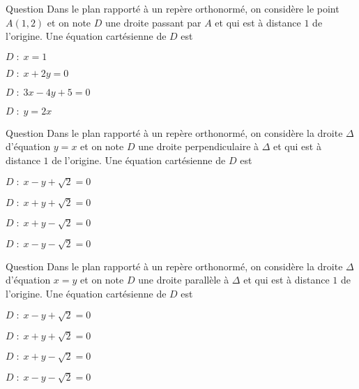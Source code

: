 \begin{multi}[multiple,feedback=
{Une équation cartésienne d'une droite \(D\) passant par \(A\) est de la forme \(a(x-1)+b(y-2)=0\). Mais,
\[1=\mbox{d}(O,D)=\frac{|a+2b|}{\sqrt{a^2+b^2}}\Leftrightarrow b=0\mbox{ ou }b=-\frac{4}{3}a.\]
Ceci détermine toutes les droites passant par \(A\) et qui sont à distance \(1\) de l'origine.
}]{Question}
Dans le plan rapporté à un repère orthonormé, on considère le point \(\displaystyle A(1,2)\) et on note \(D\) une droite passant par \(A\) et qui est à distance \(1\) de l'origine. Une équation cartésienne de \(D\) est

    \item* \(D\; :\; x=1\)
    \item \(D\; :\; x+2y=0\)
    \item* \(D\; :\; 3x-4y+5=0\)
    \item \(D\; :\; y=2x\)
\end{multi}


\begin{multi}[multiple,feedback=
{Le vecteur \(\vec{n}=(1,-1)\) est normal à \(\Delta\), il dirige \(D\). Une équation cartésienne de \(D\) est de la forme \(x+y+c=0\). Mais,
\[1=\mbox{d}(O,D)=\frac{|c|}{\sqrt{2}}\Leftrightarrow c=\pm \sqrt{2}.\]
}]{Question}
Dans le plan rapporté à un repère orthonormé, on considère la droite \(\Delta\) d'équation \(y=x\) et on note \(D\) une droite perpendiculaire à \(\Delta\) et qui est à distance \(1\) de l'origine. Une équation cartésienne de \(D\) est

    \item \(D\; :\; x-y+\sqrt{2}=0\)
    \item* \(D\; :\; x+y+\sqrt{2}=0\)
    \item* \(D\; :\; x+y-\sqrt{2}=0\)
    \item \(D\; :\; x-y-\sqrt{2}=0\)
\end{multi}


\begin{multi}[multiple,feedback=
{Le vecteur \(\vec{n}=(1,-1)\) est normal à \(\Delta\), il est aussi normal à \(D\). Une équation cartésienne de \(D\) est de la forme \(x-y+c=0\). Mais,
\[1=\mbox{d}(O,D)=\frac{|c|}{\sqrt{2}}\Leftrightarrow c=\pm \sqrt{2}.\]
}]{Question}
Dans le plan rapporté à un repère orthonormé, on considère la droite \(\Delta\) d'équation \(x=y\) et on note \(D\) une droite parallèle à \(\Delta\) et qui est à distance \(1\) de l'origine. Une équation cartésienne de \(D\) est

    \item* \(D\; :\; x-y+\sqrt{2}=0\)
    \item \(D\; :\; x+y+\sqrt{2}=0\)
    \item \(D\; :\; x+y-\sqrt{2}=0\)
    \item* \(D\; :\; x-y-\sqrt{2}=0\)
\end{multi}


